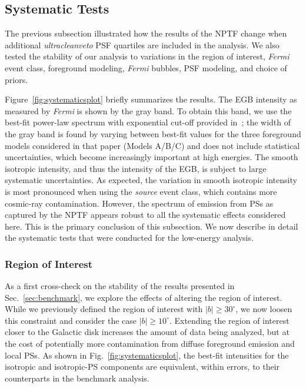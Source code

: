 \subsection{Systematic Tests}
\label{sec:systematictests}

The previous subsection illustrated how the results of the NPTF change when additional {\it ultracleanveto} PSF quartiles are included in the analysis. We also tested the stability of our analysis to variations in the region of interest, \emph{Fermi} event class,  foreground modeling, \emph{Fermi} bubbles, PSF modeling, and choice of priors.  %

Figure~\ref{fig:systematicsplot} briefly summarizes the results.  The EGB intensity as measured by \emph{Fermi} is shown by the gray band.  To obtain this band, we use the best-fit power-law spectrum with exponential cut-off provided in~\cite{Ackermann:2014usa}; the width of the gray band is found by varying between best-fit values for the three foreground models considered in that paper (Models A/B/C) and does not include statistical uncertainties, which become increasingly important at high energies.  The smooth isotropic intensity, and thus the intensity of the EGB, is subject to large systematic uncertainties.   As expected, the variation in smooth isotropic intensity is most pronounced when using the {\it source} event class, which contains more cosmic-ray contamination.    However, the spectrum of emission from PSs as captured by the NPTF appears robust to all the systematic effects considered here.  This is the primary conclusion of this subsection.  We now describe in detail the systematic tests that were conducted for the low-energy analysis.

\subsubsection{Region of Interest}

As a first cross-check on the stability of the results presented in Sec.~\ref{sec:benchmark}, we explore the effects of altering the region of interest.  While we previously defined the region of interest with $|b| \geq 30^\circ$, we now loosen this constraint and consider the case $|b| \geq 10^\circ$.  Extending the region of interest closer to the Galactic disk increases the amount of data being analyzed, but at the cost of potentially more contamination from diffuse foreground emission and local PSs.  As shown in Fig.~\ref{fig:systematicsplot}, the best-fit intensities for the isotropic and isotropic-PS components are equivalent, within errors, to their counterparts in the benchmark analysis. %

